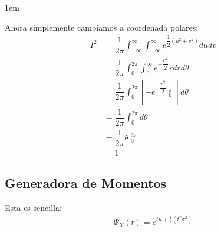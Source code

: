 \documentclass[12pt, fleqn]{report}                             %
\newenvironment{SmallIndentation}[1][0.75em]                    %
        {\begin{adjustwidth}{#1}{}\begin{footnotesize}}             %
        {\end{footnotesize}\end{adjustwidth}}                       %
\theoremstyle{break}                                            %
\newcommand{\Brackets}[1]{\left[ #1 \right]}                    %
\DeclareMathOperator \Evaluate  {\Big|}                         %
\begin{document}
\begin{SmallIndentation}[1em]
                    Ahora simplemente cambiamos a coordenada polares:
                    \begin{align}
                        I^2
                            &= \dfrac{1}{2\pi} 
                                \int_{-\infty}^\infty 
                                    \int_{-\infty}^\infty e^{\dfrac{1}{2}(u^2 + v^2)} du dv             \\
                            &= \dfrac{1}{2\pi} 
                                \int_0^{2\pi}
                                    \int_0^\infty e^{-\dfrac{r^2}{2}} r dr d\theta                      \\
                            &= \dfrac{1}{2\pi} 
                                \int_0^{2\pi}
                                    \Brackets{-e^{-\dfrac{r^2}{2}} \Evaluate_0^\pi } d\theta            \\
                            &= \dfrac{1}{2\pi} \int_0^{2\pi} d\theta                                    \\
                            &= \dfrac{1}{2\pi} \theta \Evaluate_0^{2\pi}                                \\
                            &= 1
                    \end{align}

                \end{SmallIndentation}
                    

            \clearpage
            \subsection{Generadora de Momentos}

                Esta es sencilla:
                \begin{align*}
                    \Psi_X(t) = e^{t\mu + \frac{1}{2}(t^2\sigma^2)}
                \end{align*}
\end{document}

